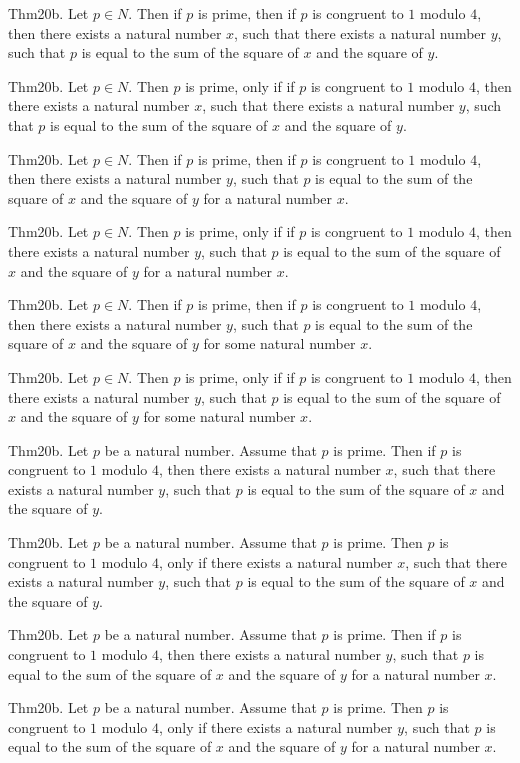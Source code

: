 \documentclass{article}
\begin{document}
Thm20b. Let $p \in N$. Then if $p$ is prime, then if $p$ is congruent to $1$ modulo $4$, then there exists a natural number $x$, such that there exists a natural number $y$, such that $p$ is equal to the sum of the square of $x$ and the square of $y$.

Thm20b. Let $p \in N$. Then $p$ is prime, only if if $p$ is congruent to $1$ modulo $4$, then there exists a natural number $x$, such that there exists a natural number $y$, such that $p$ is equal to the sum of the square of $x$ and the square of $y$.

Thm20b. Let $p \in N$. Then if $p$ is prime, then if $p$ is congruent to $1$ modulo $4$, then there exists a natural number $y$, such that $p$ is equal to the sum of the square of $x$ and the square of $y$ for a natural number $x$.

Thm20b. Let $p \in N$. Then $p$ is prime, only if if $p$ is congruent to $1$ modulo $4$, then there exists a natural number $y$, such that $p$ is equal to the sum of the square of $x$ and the square of $y$ for a natural number $x$.

Thm20b. Let $p \in N$. Then if $p$ is prime, then if $p$ is congruent to $1$ modulo $4$, then there exists a natural number $y$, such that $p$ is equal to the sum of the square of $x$ and the square of $y$ for some natural number $x$.

Thm20b. Let $p \in N$. Then $p$ is prime, only if if $p$ is congruent to $1$ modulo $4$, then there exists a natural number $y$, such that $p$ is equal to the sum of the square of $x$ and the square of $y$ for some natural number $x$.

Thm20b. Let $p$ be a natural number. Assume that $p$ is prime. Then if $p$ is congruent to $1$ modulo $4$, then there exists a natural number $x$, such that there exists a natural number $y$, such that $p$ is equal to the sum of the square of $x$ and the square of $y$.

Thm20b. Let $p$ be a natural number. Assume that $p$ is prime. Then $p$ is congruent to $1$ modulo $4$, only if there exists a natural number $x$, such that there exists a natural number $y$, such that $p$ is equal to the sum of the square of $x$ and the square of $y$.

Thm20b. Let $p$ be a natural number. Assume that $p$ is prime. Then if $p$ is congruent to $1$ modulo $4$, then there exists a natural number $y$, such that $p$ is equal to the sum of the square of $x$ and the square of $y$ for a natural number $x$.

Thm20b. Let $p$ be a natural number. Assume that $p$ is prime. Then $p$ is congruent to $1$ modulo $4$, only if there exists a natural number $y$, such that $p$ is equal to the sum of the square of $x$ and the square of $y$ for a natural number $x$.
\end{document}
